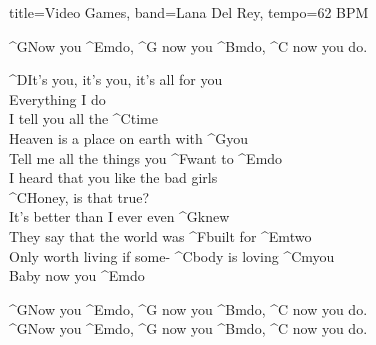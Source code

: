 \documentclass[titlepage]{article}
\begin{document}
\begin{song}{title=Video Games, band=Lana Del Rey, tempo=62 BPM}
	\begin{interlude}
		^{G}Now you ^{Em}do, ^G{} now you ^{Bm}do, ^{C}{} now you do.
	\end{interlude}

	\begin{chorus}
		^{D}It's you, it's you, it's all for you \\
		Everything I do \\
		I tell you all the ^{C}time \\
		Heaven is a place on earth with ^{G}you \\
		Tell me all the things you ^Fwant to ^{Em}do \\
		I heard that you like the bad girls \\
		^{C}Honey, is that true? \\
		It's better than I ever even ^{G}knew \\
		They say that the world was ^Fbuilt for ^{Em}two \\
		Only worth living if some- ^Cbody is loving ^{Cm}you \\
		Baby now you ^{Em}do
	\end{chorus}

	\begin{interlude}
		^{G}Now you ^{Em}do, ^G{} now you ^{Bm}do, ^{C}{} now you do. \\
		^{G}Now you ^{Em}do, ^G{} now you ^{Bm}do, ^{C}{} now you do.
	\end{interlude}
\end{song}
\end{document}
